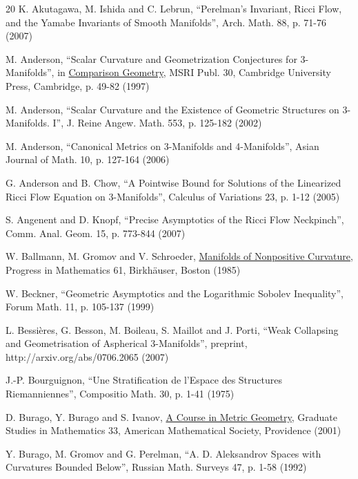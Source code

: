 \documentclass[12pt]{amsart}
\numberwithin{equation}{section}
\theoremstyle{plain}
\theoremstyle{definition}
\theoremstyle{remark}
\begin{document}
\begin{thebibliography}{20}
 K. Akutagawa, M. Ishida and C. Lebrun,
``Perelman's Invariant, Ricci Flow, and the Yamabe Invariants of Smooth Manifolds'',
Arch. Math. 88, p. 71-76 (2007)

 M. Anderson,
``Scalar Curvature and Geometrization Conjectures for $3$-Manifolds'',
in \underline{Comparison Geometry}, MSRI Publ. 30,
Cambridge University Press, Cambridge, p. 49-82 (1997)

 M. Anderson, 
``Scalar Curvature and the Existence of Geometric Structures on 
$3$-Manifolds. I'', J. Reine Angew. Math. 553, p. 125-182 (2002)

 M. Anderson,
``Canonical Metrics on 3-Manifolds and 4-Manifolds'',
Asian Journal of Math. 10, p. 127-164 (2006)

 G. Anderson and B. Chow,
``A Pointwise Bound for Solutions of the Linearized Ricci Flow
Equation on 3-Manifolds'', Calculus of Variations 23, p. 1-12 (2005)

  S. Angenent and D. Knopf,
``Precise Asymptotics of the Ricci Flow
Neckpinch'', Comm. Anal. Geom. 15, p. 773-844 (2007)

W. Ballmann, M. Gromov and V. Schroeder,
\underline{Manifolds of Nonpositive Curvature},
Progress in Mathematics 61, 
Birkh\"auser, Boston (1985)

W. Beckner,
``Geometric Asymptotics and the Logarithmic Sobolev Inequality'',
Forum Math. 11, p. 105-137 (1999)

 L. Bessi\`eres, G. Besson, M. Boileau, S. Maillot and
J. Porti, ``Weak Collapsing and Geometrisation of Aspherical 3-Manifolds'',
preprint, http://arxiv.org/abs/0706.2065 (2007)

 J.-P. Bourguignon, ``Une Stratification de l'Espace 
des Structures Riemanniennes'',
Compositio Math. 30, p. 1-41 (1975)

D. Burago, Y. Burago and S. Ivanov, 
\underline{A Course in Metric Geometry},
Graduate Studies in Mathematics 33,  
American Mathematical Society, Providence (2001)

Y. Burago, M. Gromov and G. Perelman,
``A. D. Aleksandrov Spaces with Curvatures Bounded Below'',
Russian Math. Surveys 47, p. 1-58 (1992)


\end{thebibliography}
\end{document}
